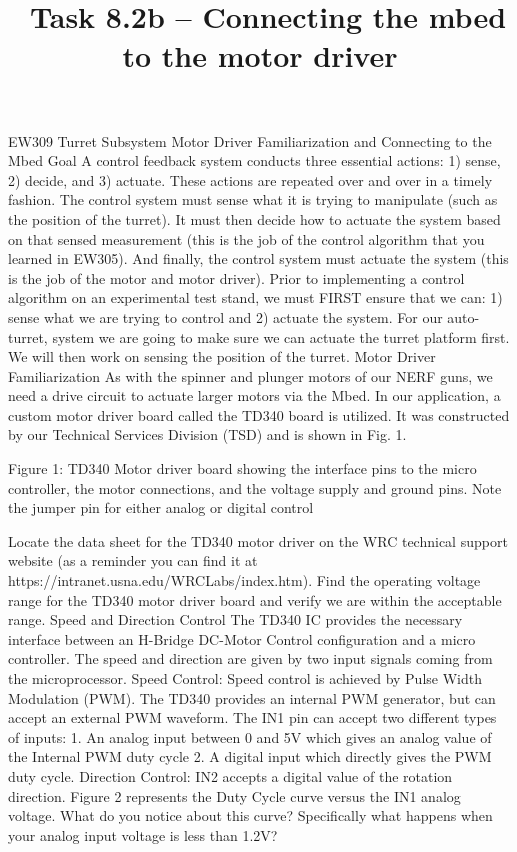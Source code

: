 \documentclass{tufte-handout}
\title{\usnaCourseNumber\ Task 8.2b -- Connecting the mbed to the motor driver}
\author{\usnaInstructorShort}
\date{\printdate{\courseWeekSeven}}
\begin{document}
\maketitle

EW309 Turret Subsystem 
Motor Driver Familiarization and Connecting to the Mbed
Goal
A control feedback system conducts three essential actions: 1) sense, 2) decide, and 3) actuate. These actions are repeated over and over in a timely fashion. The control system must sense what it is trying to manipulate (such as the position of the turret). It must then decide how to actuate the system based on that sensed measurement (this is the job of the control algorithm that you learned in EW305). And finally, the control system must actuate the system (this is the job of the motor and motor driver). 
Prior to implementing a control algorithm on an experimental test stand, we must FIRST ensure that we can: 1) sense what we are trying to control and 2) actuate the system.  For our auto-turret, system we are going to make sure we can actuate the turret platform first. We will then work on sensing the position of the turret.
Motor Driver Familiarization
As with the spinner and plunger motors of our NERF guns, we need a drive circuit to actuate larger motors via the Mbed. In our application, a custom motor driver board called the TD340 board is utilized. It was constructed by our Technical Services Division (TSD) and is shown in Fig. 1.              
                      





Figure 1: TD340 Motor driver board showing the interface pins to the micro   controller, the motor connections, and the voltage supply and ground pins.  Note the jumper pin for either analog or digital control

Locate the data sheet for the TD340 motor driver on the WRC technical support website (as a reminder you can find it at https://intranet.usna.edu/WRCLabs/index.htm). Find the operating voltage range for the TD340 motor driver board and verify we are within the acceptable range.
Speed and Direction Control
The TD340 IC provides the necessary interface between an H-Bridge DC-Motor Control configuration and a micro controller. The speed and direction are given by two input signals coming from the microprocessor.
Speed Control: Speed control is achieved by Pulse Width Modulation (PWM). The TD340 provides an internal PWM generator, but can accept an external PWM waveform.  The IN1 pin can accept two different types of inputs: 
    1. An analog input between 0 and 5V which gives an analog value of the Internal PWM duty cycle
    2. A digital input which directly gives the PWM duty cycle.  
Direction Control: IN2 accepts a digital value of the rotation direction.
Figure 2 represents the Duty Cycle curve versus the IN1 analog voltage.  What do you notice about this curve?  Specifically what happens when your analog input voltage is less than 1.2V?
\end{document}
